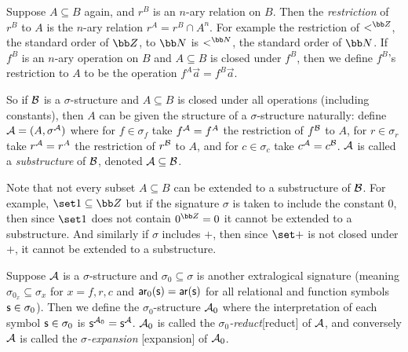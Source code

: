 Suppose $A\subseteq B$ again, and $r^B$ is an $n$-ary relation on $B$.
Then the {\it restriction} of $r^B$ to $A$ is the $n$-ary relation $r^A=r^B\cap A^n$.
For example the restriction of $<^{\bb Z}$, the standard order of ${\bb Z}$, to ${\bb N}$ is $<^{\bb N}$, the standard order of ${\bb N}$.
If $f^B$ is an $n$-ary operation on $B$ and $A\subseteq B$ is closed under $f^B$, then we define $f^B$'s restriction to $A$ to be the operation $f^A\vec a=f^B\vec a$.

So if ${\cal B}$ is a $\sigma$-structure and $A\subseteq B$ is closed under all operations (including constants), then $A$ can be given the structure of a $\sigma$-structure naturally: define
${\cal A}=(A,\sigma^{\cal A})$ where for $f\in\sigma_f$ take $f^{\cal A}=f^A$ the restriction of $f^{\cal B}$ to $A$, for $r\in\sigma_r$ take $r^{\cal A}=r^A$ the restriction of $r^{\cal B}$ to $A$, and
for $c\in\sigma_c$ take $c^{\cal A}=c^{\cal B}$.
${\cal A}$ is called a {\it substructure} of ${\cal B}$, denoted ${\cal A}\subseteq{\cal B}$.

Note that not every subset $A\subseteq B$ can be extended to a substructure of ${\cal B}$.
For example, $\set1\subseteq{\bb Z}$ but if the signature $\sigma$ is taken to include the constant $0$, then since $\set1$ does not contain $0^{\bb Z}=0$ it cannot be extended to a substructure.
And similarly if $\sigma$ includes $+$, then since $\set+$ is not closed under $+$, it cannot be extended to a substructure.

Suppose ${\cal A}$ is a $\sigma$-structure and $\sigma_0\subseteq\sigma$ is another extralogical signature (meaning $\sigma_{0_x}\subseteq\sigma_x$ for $x=f,r,c$ and ${\sf ar}_0({\sf s})={\sf ar}({\sf s})$
for all relational and function symbols ${\sf s}\in\sigma_0$).
Then we define the $\sigma_0$-structure ${\cal A}_0$ where the interpretation of each symbol ${\sf s}\in\sigma_0$ is ${\sf s}^{{\cal A}_0}={\sf s}^{\cal A}$.
${\cal A}_0$ is called the {\it $\sigma_0$-reduct}[reduct] of ${\cal A}$, and conversely ${\cal A}$ is called the {\it $\sigma$-expansion}%
[expansion] of ${\cal A}_0$.
